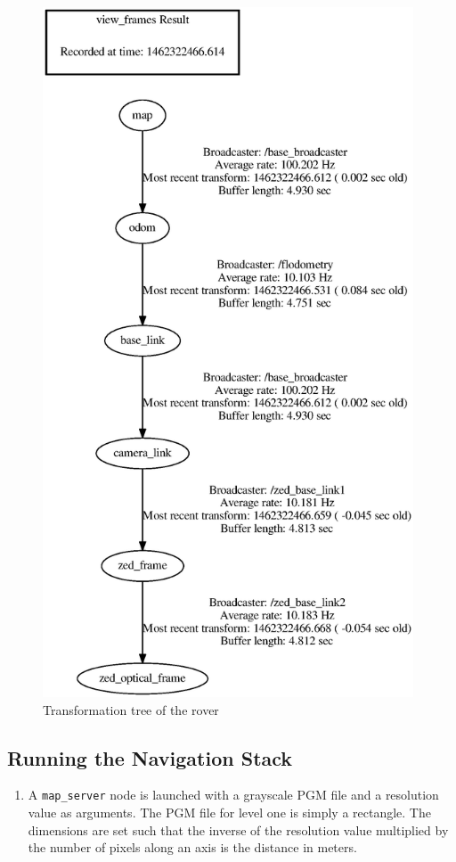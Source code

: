 \documentclass[10pt, oneside,onecolumn]{IEEEtran}
\begin{document}
\begin{titlepage}
\begin{figure}[p!]
\centering
\includegraphics[width=110mm]{frames.eps}
\caption{Transformation tree of the rover}
\end{figure}

\subsection{Running the Navigation Stack}
\begin{enumerate}

\item A \texttt{map\_server} node is launched with a grayscale PGM file and a resolution value as arguments. The PGM file for level one is simply a rectangle. The dimensions are set such that the inverse of the resolution value multiplied by the number of pixels along an axis is the distance in meters. 


\end{enumerate}
\end{titlepage}
\end{document}
